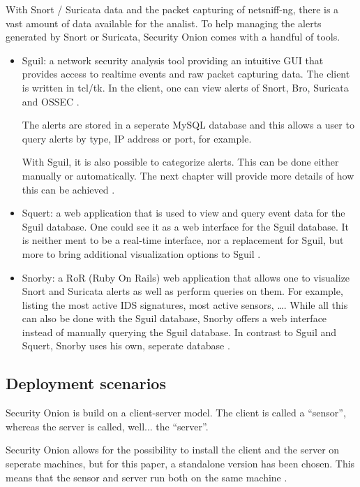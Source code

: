 With Snort / Suricata data and the packet capturing of netsniff-ng, there is a vast amount of data available for the analist. To help managing the alerts generated by Snort or Suricata, Security Onion comes with a handful of tools.

\begin{itemize}
\item Sguil: a network security analysis tool providing an intuitive GUI that provides access to realtime events and raw packet capturing data. The client is written in tcl/tk. In the client, one can view alerts of Snort, Bro, Suricata and OSSEC \citep{Sguil}.

The alerts are stored in a seperate MySQL database and this allows a user to query alerts by type, IP address or port, for example.

With Sguil, it is also possible to categorize alerts. This can be done either manually or automatically. The next chapter will provide more details of how this can be achieved \citep{Sguil}.

\item Squert: a web application that is used to view and query event data for the Sguil database. One could see it as a web interface for the Sguil database. It is neither ment to be a real-time interface, nor a replacement for Sguil, but more to bring additional visualization options to Sguil \citep{Squert}.

\item Snorby: a RoR (Ruby On Rails) web application that allows one to visualize Snort and Suricata alerts as well as perform queries on them. For example, listing the most active IDS signatures, most active sensors, \ldots. While all this can also be done with the Sguil database, Snorby offers a web interface instead of manually querying the Sguil database. In contrast to Sguil and Squert, Snorby uses his own, seperate database \citep{Snorby}.
\end{itemize}

\subsection{Deployment scenarios}

Security Onion is build on a client-server model. The client is called a ``sensor'', whereas the server is called, well... the ``server''.

Security Onion allows for the possibility to install the client and the server on seperate machines, but for this paper, a standalone version has been chosen. This means that the sensor and server run both on the same machine \citep{SO1}.


